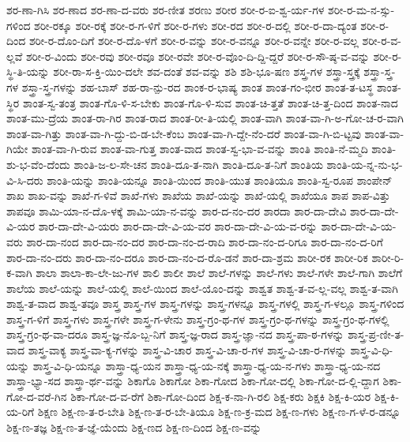 {ಶರ-ಣಾ-ಗಿಸಿ
ಶರ-ಣಾದ
ಶರ-ಣಾ-ದ-ವರು
ಶರ-ಣೀತ
ಶರಣು
ಶರೀರ
ಶರೀ-ರ-ಐ-ಶ್ವ-ರ್ಯ-ಗಳ
ಶರೀ-ರ-ಮ-ನ-ಸ್ಸು-ಗಳಿಂದ
ಶರೀ-ರಕ್ಕೂ
ಶರೀ-ರಕ್ಕೆ
ಶರೀ-ರ-ಗ-ಳಿಗೆ
ಶರೀ-ರ-ಗಳು
ಶರೀ-ರದ
ಶರೀ-ರ-ದಲ್ಲಿ
ಶರೀ-ರ-ದಾ-ದ್ಯಂತ
ಶರೀ-ರ-ದಿಂದ
ಶರೀ-ರ-ದೊಂ-ದಿಗೆ
ಶರೀ-ರ-ದೊ-ಳಗೆ
ಶರೀ-ರ-ವನ್ನು
ಶರೀ-ರ-ವನ್ನೂ
ಶರೀ-ರ-ವನ್ನೇ
ಶರೀ-ರ-ವಲ್ಲ
ಶರೀ-ರ-ವ-ಲ್ಲವೆ
ಶರೀ-ರ-ವಿಂದು
ಶರೀ-ರವು
ಶರೀ-ರವೂ
ಶರೀ-ರವೇ
ಶರೀ-ರ-ವೊಂ-ದಿ-ದ್ದಿ-ದ್ದರೆ
ಶರೀ-ರ-ಸೌ-ಷ್ಠ-ವ-ವನ್ನು
ಶರೀ-ರ-ಸ್ಥಿ-ತಿ-ಯನ್ನು
ಶರೀ-ರಾ-ಸ-ಕ್ತಿ-ಯಿಂ-ದಲೇ
ಶವ-ದಂತೆ
ಶವ-ವನ್ನು
ಶಶಿ
ಶಶಿ-ಭೂ-ಷಣ
ಶಸ್ತ್ರ-ಗಳ
ಶಸ್ತ್ರಾ-ಸ್ತ್ರಕ್ಕೆ
ಶಸ್ತ್ರಾ-ಸ್ತ್ರ-ಗಳ
ಶಸ್ತ್ರಾ-ಸ್ತ್ರ-ಗಳನ್ನು
ಶಹ-ಬಾಸ್
ಶಹ-ರಾ-ನ್ಪು-ರದ
ಶಾಂಕ-ರ-ಭಾಷ್ಯ
ಶಾಂತ
ಶಾಂತ-ಗಂ-ಭೀರ
ಶಾಂತ-ತ-ಟಸ್ಥ
ಶಾಂತ-ಸ್ಥಿರ
ಶಾಂತ-ಸ್ವ-ತಂತ್ರ
ಶಾಂತ-ಗೊ-ಳಿ-ಸ-ಬೇಕು
ಶಾಂತ-ಗೊ-ಳಿ-ಸುವ
ಶಾಂತ-ಚಿ-ತ್ತತೆ
ಶಾಂತ-ಚಿ-ತ್ತ-ದಿಂದ
ಶಾಂತ-ನಾದ
ಶಾಂತ-ಮು-ದ್ರೆಯ
ಶಾಂತ-ರಾ-ಗಿರ
ಶಾಂತ-ರಾದ
ಶಾಂತ-ರೀ-ತಿ-ಯಲ್ಲಿ
ಶಾಂತ-ವಾಗಿ
ಶಾಂತ-ವಾ-ಗಿ-ಅ-ಗೋ-ಚ-ರ-ವಾಗಿ
ಶಾಂತ-ವಾ-ಗಿತ್ತು
ಶಾಂತ-ವಾ-ಗಿ-ದ್ದು-ಬಿ-ಡ-ಬೇ-ಕೆಂಬ
ಶಾಂತ-ವಾ-ಗಿ-ದ್ದೇ-ನೆಂ-ದರೆ
ಶಾಂತ-ವಾ-ಗಿ-ಬಿ-ಟ್ಟವು
ಶಾಂತ-ವಾ-ಗಿಯೇ
ಶಾಂತ-ವಾ-ಗಿ-ರುವ
ಶಾಂತ-ವಾ-ಗುತ್ತ
ಶಾಂತ-ವಾದ
ಶಾಂತ-ಸ್ವ-ಭಾ-ವ-ವನ್ನು
ಶಾಂತಿ
ಶಾಂತಿ-ನೆ-ಮ್ಮದಿ
ಶಾಂತಿ-ಶು-ಭ-ವೆಂ-ದೆಂದು
ಶಾಂತಿ-ಜ-ಲ-ಸೇ-ಚನ
ಶಾಂತಿ-ದೂ-ತ-ನಾಗಿ
ಶಾಂತಿ-ದೂ-ತ-ನಿಗೆ
ಶಾಂತಿಯ
ಶಾಂತಿ-ಯ-ನ್ನ-ನು-ಭ-ವಿ-ಸಿ-ದರು
ಶಾಂತಿ-ಯನ್ನು
ಶಾಂತಿ-ಯನ್ನೂ
ಶಾಂತಿ-ಯಿಂದ
ಶಾಂತಿ-ಯುತ
ಶಾಂತಿಯೂ
ಶಾಂತಿ-ಸ್ವ-ರೂಪ
ಶಾಂಪೇನ್
ಶಾಖ
ಶಾಖ-ವನ್ನು
ಶಾಖೆ-ಗ-ಳಿವೆ
ಶಾಖೆ-ಗಳು
ಶಾಖೆಯ
ಶಾಖೆ-ಯನ್ನು
ಶಾಖೆ-ಯಲ್ಲಿ
ಶಾಖೆಯೂ
ಶಾಪ
ಶಾಪ-ವಿತ್ತು
ಶಾಪವೂ
ಶಾಮಿ-ಯಾ-ನ-ದೊ-ಳಕ್ಕೆ
ಶಾಮಿ-ಯಾ-ನ-ವನ್ನು
ಶಾರ-ದ-ನಂ-ದರ
ಶಾರದಾ
ಶಾರ-ದಾ-ದೇವಿ
ಶಾರ-ದಾ-ದೇ-ವಿ-ಯರ
ಶಾರ-ದಾ-ದೇ-ವಿ-ಯರು
ಶಾರ-ದಾ-ದೇ-ವಿ-ಯ-ವರ
ಶಾರ-ದಾ-ದೇ-ವಿ-ಯ-ವ-ರನ್ನು
ಶಾರ-ದಾ-ದೇ-ವಿ-ಯ-ವರು
ಶಾರ-ದಾ-ನಂದ
ಶಾರ-ದಾ-ನಂ-ದರ
ಶಾರ-ದಾ-ನಂ-ದ-ರಾದಿ
ಶಾರ-ದಾ-ನಂ-ದ-ರಿಗೂ
ಶಾರ-ದಾ-ನಂ-ದ-ರಿಗೆ
ಶಾರ-ದಾ-ನಂ-ದರು
ಶಾರ-ದಾ-ನಂ-ದರೂ
ಶಾರ-ದಾ-ನಂ-ದ-ರೊ-ಡನೆ
ಶಾರ-ದಾ-ಶ್ರಮ
ಶಾರೀ-ರಕ
ಶಾರೀ-ರಿಕ
ಶಾರೀ-ರಿ-ಕ-ವಾಗಿ
ಶಾಲಾ
ಶಾಲಾ-ಕಾ-ಲೇ-ಜು-ಗಳ
ಶಾಲಿ
ಶಾಲೀ
ಶಾಲೆ
ಶಾಲೆ-ಗಳನ್ನು
ಶಾಲೆ-ಗಳು
ಶಾಲೆ-ಗಳೇ
ಶಾಲೆ-ಗಾಗಿ
ಶಾಲೆಗೆ
ಶಾಲೆಯ
ಶಾಲೆ-ಯನ್ನು
ಶಾಲೆ-ಯಲ್ಲಿ
ಶಾಲೆ-ಯಿಂದ
ಶಾಲೆ-ಯೊಂ-ದನ್ನು
ಶಾಶ್ವತ
ಶಾಶ್ವ-ತ-ವ-ಲ್ಲ-ವಲ್ಲ
ಶಾಶ್ವ-ತ-ವಾಗಿ
ಶಾಶ್ವ-ತ-ವಾದ
ಶಾಶ್ವ-ತವೂ
ಶಾಸ್ತ್ರ
ಶಾಸ್ತ್ರ-ಗಳ
ಶಾಸ್ತ್ರ-ಗಳನ್ನು
ಶಾಸ್ತ್ರ-ಗಳನ್ನೂ
ಶಾಸ್ತ್ರ-ಗಳಲ್ಲಿ
ಶಾಸ್ತ್ರ-ಗ-ಳಲ್ಲೂ
ಶಾಸ್ತ್ರ-ಗಳಿಂದ
ಶಾಸ್ತ್ರ-ಗ-ಳಿಗೆ
ಶಾಸ್ತ್ರ-ಗಳು
ಶಾಸ್ತ್ರ-ಗಳೇ
ಶಾಸ್ತ್ರ-ಗ-ಳೇನು
ಶಾಸ್ತ್ರ-ಗ್ರಂ-ಥ-ಗಳ
ಶಾಸ್ತ್ರ-ಗ್ರಂ-ಥ-ಗಳನ್ನು
ಶಾಸ್ತ್ರ-ಗ್ರಂ-ಥ-ಗಳಲ್ಲಿ
ಶಾಸ್ತ್ರ-ಗ್ರಂ-ಥ-ವಾ-ದರೂ
ಶಾಸ್ತ್ರ-ಜ್ಞ-ನೊ-ಬ್ಬ-ನಿಗೆ
ಶಾಸ್ತ್ರ-ಜ್ಞ-ರಾದ
ಶಾಸ್ತ್ರ-ಜ್ಞಾ-ನದ
ಶಾಸ್ತ್ರ-ಪಾ-ಠ-ಗಳನ್ನು
ಶಾಸ್ತ್ರ-ಪ್ರ-ಣೀ-ತ-ವಾದ
ಶಾಸ್ತ್ರ-ವಾಕ್ಯ
ಶಾಸ್ತ್ರ-ವಾ-ಕ್ಯ-ಗಳನ್ನು
ಶಾಸ್ತ್ರ-ವಿ-ಚಾರ
ಶಾಸ್ತ್ರ-ವಿ-ಚಾ-ರ-ಗಳ
ಶಾಸ್ತ್ರ-ವಿ-ಚಾ-ರ-ಗಳನ್ನು
ಶಾಸ್ತ್ರ-ವಿ-ಧಿ-ಯನ್ನು
ಶಾಸ್ತ್ರ-ವಿ-ಧಿ-ಯನ್ನೂ
ಶಾಸ್ತ್ರಾ-ಧ್ಯ-ಯನ
ಶಾಸ್ತ್ರಾ-ಧ್ಯ-ಯ-ನಕ್ಕೆ
ಶಾಸ್ತ್ರಾ-ಧ್ಯ-ಯ-ನ-ಗಳು
ಶಾಸ್ತ್ರಾ-ಧ್ಯ-ಯ-ನದ
ಶಾಸ್ತ್ರಾ-ಭ್ಯಾ-ಸದ
ಶಾಸ್ತ್ರಾ-ರ್ಥ-ವನ್ನು
ಶಿಕಾಗೊ
ಶಿಕಾಗೋ
ಶಿಕಾ-ಗೋದ
ಶಿಕಾ-ಗೋ-ದಲ್ಲಿ
ಶಿಕಾ-ಗೋ-ದ-ಲ್ಲಿ-ದ್ದಾಗ
ಶಿಕಾ-ಗೋ-ದ-ವರೆ-ಗಿನ
ಶಿಕಾ-ಗೋ-ದ-ವ-ರೆಗೆ
ಶಿಕಾ-ಗೋ-ದಿಂದ
ಶಿಕ್ಷ-ಕ-ನಾ-ಗಿ-ರಲಿ
ಶಿಕ್ಷ-ಕರು
ಶಿಕ್ಷಕಿ
ಶಿಕ್ಷ-ಕಿ-ಯರ
ಶಿಕ್ಷ-ಕಿ-ಯ-ರಿಗೆ
ಶಿಕ್ಷಣ
ಶಿಕ್ಷ-ಣ-ತ-ರ-ಬೇತಿ
ಶಿಕ್ಷ-ಣ-ತ-ರ-ಬೇ-ತಿಯೂ
ಶಿಕ್ಷ-ಣ-ಕ್ರ-ಮದ
ಶಿಕ್ಷ-ಣ-ಗಳು
ಶಿಕ್ಷ-ಣ-ಗ-ಳೆ-ರ-ಡನ್ನೂ
ಶಿಕ್ಷ-ಣ-ತಜ್ಞ
ಶಿಕ್ಷ-ಣ-ತ-ಜ್ಞೆ-ಯೆಂದು
ಶಿಕ್ಷ-ಣದ
ಶಿಕ್ಷ-ಣ-ದಿಂದ
ಶಿಕ್ಷ-ಣ-ವನ್ನು
}
